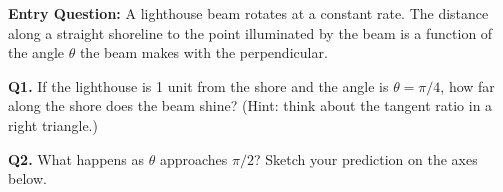 \documentclass[10pt]{article}
\begin{document}
\vspace{0.06in}

\begin{hookbox}
\textbf{Entry Question:} A lighthouse beam rotates at a constant rate.  The distance
along a straight shoreline to the point illuminated by the beam is a function of the
angle $\theta$ the beam makes with the perpendicular.

\vspace{4pt}
\textbf{Q1.} If the lighthouse is 1 unit from the shore and the angle is $\theta=\pi/4$,
how far along the shore does the beam shine?  (Hint: think about the tangent ratio in a
right triangle.)

\textbf{Q2.} What happens as $\theta$ approaches $\pi/2$?  Sketch your prediction on the
axes below.

\vspace{4pt}
\begin{center}
\end{center}

\end{hookbox}

\vspace{0.06in}
\end{document}
